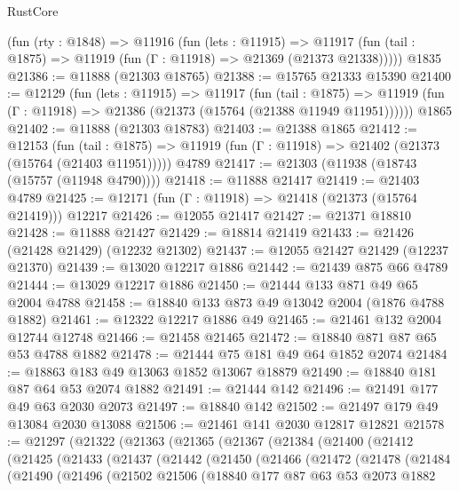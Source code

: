 \begin{lexlean}{RustCore}
\begin{coremodule}
    (fun (rty : @1848) =>
    @11916
      (fun (lets : @11915) =>
      @11917 (fun (tail : @1875) => @11919 (fun (Γ : @11918) => @21369 (@21373 @21338)))))
    @1835
@21386 := @11888 (@21303 @18765)
@21388 := @15765 @21333 @15390
@21400 := @12129
    (fun (lets : @11915) =>
    @11917
      (fun (tail : @1875) =>
      @11919 (fun (Γ : @11918) => @21386 (@21373 (@15764 (@21388 @11949 @11951))))))
    @1865
@21402 := @11888 (@21303 @18783)
@21403 := @21388 @1865
@21412 := @12153
    (fun (tail : @1875) => @11919 (fun (Γ : @11918) => @21402 (@21373 (@15764 (@21403 @11951)))))
    @4789
@21417 := @21303 (@11938 (@18743 (@15757 (@11948 @4790))))
@21418 := @11888 @21417
@21419 := @21403 @4789
@21425 := @12171 (fun (Γ : @11918) => @21418 (@21373 (@15764 @21419))) @12217
@21426 := @12055 @21417
@21427 := @21371 @18810
@21428 := @11888 @21427
@21429 := @18814 @21419
@21433 := @21426 (@21428 @21429) (@12232 @21302)
@21437 := @12055 @21427 @21429 (@12237 @21370)
@21439 := @13020 @12217 @1886
@21442 := @21439 @875 @66 @4789
@21444 := @13029 @12217 @1886
@21450 := @21444 @133 @871 @49 @65 @2004 @4788
@21458 := @18840 @133 @873 @49 @13042 @2004 (@1876 @4788 @1882)
@21461 := @12322 @12217 @1886 @49
@21465 := @21461 @132 @2004 @12744 @12748
@21466 := @21458 @21465
@21472 := @18840 @871 @87 @65 @53 @4788 @1882
@21478 := @21444 @75 @181 @49 @64 @1852 @2074
@21484 := @18863 @183 @49 @13063 @1852 @13067 @18879
@21490 := @18840 @181 @87 @64 @53 @2074 @1882
@21491 := @21444 @142
@21496 := @21491 @177 @49 @63 @2030 @2073
@21497 := @18840 @142
@21502 := @21497 @179 @49 @13084 @2030 @13088
@21506 := @21461 @141 @2030 @12817 @12821
@21578 := @21297
    (@21322
      (@21363
        (@21365
          (@21367
            (@21384
              (@21400
                (@21412
                  (@21425
                    (@21433
                      (@21437
                        (@21442
                          (@21450
                            (@21466
                              (@21472
                                (@21478
                                  (@21484
                                    (@21490
                                      (@21496
                                        (@21502
                                          @21506
                                          (@18840
                                            @177
                                            @87
                                            @63
                                            @53
                                            @2073
                                            @1882

\end{coremodule}
\end{lexlean}
